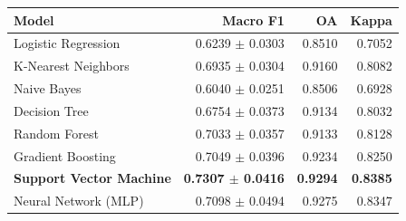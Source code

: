 \begin{tabular}{lrrr}
\toprule
Model & Macro F1 & OA & Kappa \\
\midrule
Logistic Regression & 0.6239 $\pm$ 0.0303 & 0.8510 & 0.7052 \\
K-Nearest Neighbors & 0.6935 $\pm$ 0.0304 & 0.9160 & 0.8082 \\
Naive Bayes & 0.6040 $\pm$ 0.0251 & 0.8506 & 0.6928 \\
Decision Tree & 0.6754 $\pm$ 0.0373 & 0.9134 & 0.8032 \\
Random Forest & 0.7033 $\pm$ 0.0357 & 0.9133 & 0.8128 \\
Gradient Boosting & 0.7049 $\pm$ 0.0396 & 0.9234 & 0.8250 \\
\textbf{Support Vector Machine} & \textbf{0.7307 $\pm$ 0.0416} & \textbf{0.9294} & \textbf{0.8385} \\
Neural Network (MLP) & 0.7098 $\pm$ 0.0494 & 0.9275 & 0.8347 \\
\bottomrule
\end{tabular}
